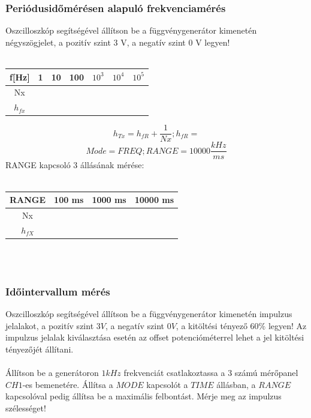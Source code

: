 \documentclass[10pt,a4paper]{article}
\begin{document}
		\subsubsection{Periódusidőmérésen alapuló frekvenciamérés}
		Oszcilloszkóp segítségével állítson be a függvénygenerátor kimenetén
négyszögjelet, a pozitív szint 3 V, a negatív szint 0 V legyen!
		\\\\
		\begin{tabular}{|c|c|c|c|c|c|c|}
		\hline 
		f[Hz] & 1 & 10 & 100 & $10^3$ & $10^4$ & $10^5$ \\ 
		\hline 
		Nx &  &  &  &  &  &  \\ 
		\hline 
		$h_{fx}$ &  &  &  &  &  &  \\ 
		\hline 
		\end{tabular} 
		$$h_{Tx} = h_{fR} + \frac{1}{Nx}; h_{fR} = $$
		$$Mode=FREQ; RANGE=10000 \frac{kHz}{ms}$$
		RANGE kapcsoló 3 állásának mérése:\\\\
		\begin{tabular}{|c|c|c|c|}
		\hline 
		RANGE & 100 ms & 1000 ms & 10000 ms \\ 
		\hline 
		Nx &  &  &  \\ 
		\hline 
		$h_{fX}$ &  &  &  \\ 
		\hline 
		\end{tabular} 
		\\\\ $$$$ $$$$ $$$$
		\subsubsection{Időintervallum mérés}
		Oszcilloszkóp segítségével állítson be a függvénygenerátor kimenetén
impulzus jelalakot, a pozitív szint $3 V$, a negatív szint $0 V$, a kitöltési tényező $60 \%$ legyen! Az impulzus jelalak kiválasztása esetén az offset
potencióméterrel lehet a jel kitöltési tényezőjét állítani.\\\\
Állítson be a generátoron $1 kHz$ frekvenciát csatlakoztassa a 3 számú
mérőpanel $CH1$-es bemenetére. Állítsa a $MODE$ kapcsolót a $TIME$
állásban, a $RANGE$ kapcsolóval pedig állítsa be a maximális felbontást.
Mérje meg az impulzus szélességet!\\\\ \\\\ \\\\ \\\\
\end{document}
